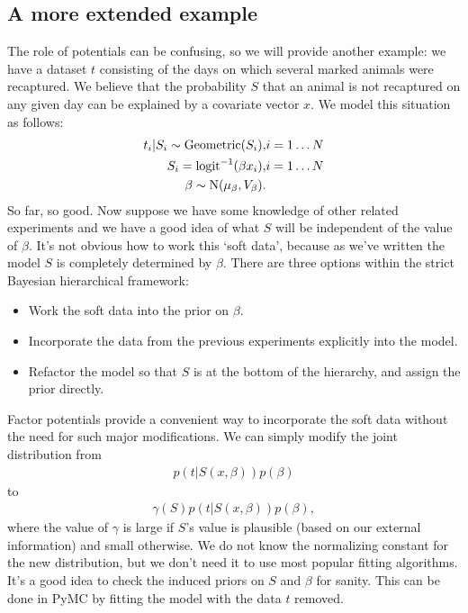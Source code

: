 \subsection*{A more extended example} 
The role of potentials can be confusing, so we will provide another example: we have a dataset $t$ consisting of the days on which several marked animals were recaptured. We believe that the probability $S$ that an animal is not recaptured on any given day can be explained by a covariate vector $x$. We model this situation as follows:
\begin{eqnarray*}
    t_i|S_i \sim \textup{Geometric}(S_i), & i=1\ldots N\\
    S_i = \textup{logit}^{-1}(\beta x_i), &i=1\ldots N\\
    \beta\sim \textup{N}(\mu_\beta, V_\beta).
\end{eqnarray*}
So far, so good. Now suppose we have some knowledge of other related experiments and we have a good idea of what $S$ will be independent of the value of $\beta$. It's not obvious how to work this `soft data', because as we've written the model $S$ is completely determined by $\beta$. There are three options within the strict Bayesian hierarchical framework:
\begin{itemize}
    \item Work the soft data into the prior on $\beta$.
    \item Incorporate the data from the previous experiments explicitly into the model.
    \item Refactor the model so that $S$ is at the bottom of the hierarchy, and assign the prior directly.
\end{itemize}

Factor potentials provide a convenient way to incorporate the soft data without the need for such major modifications. We can simply modify the joint distribution from
\begin{eqnarray*}
    p(t|S(x,\beta)) p(\beta)
\end{eqnarray*}
to
\begin{eqnarray*}
    \gamma(S) p(t|S(x,\beta)) p(\beta),
\end{eqnarray*}
where the value of $\gamma$ is large if $S$'s value is plausible (based on our external information) and small otherwise. We do not know the normalizing constant for the new distribution, but we don't need it to use most popular fitting algorithms. It's a good idea to check the induced priors on $S$ and $\beta$ for sanity. This can be done in PyMC by fitting the model with the data $t$ removed. 

